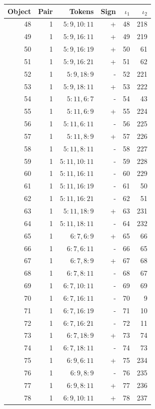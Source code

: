 \begin{center}\begin{tabular}{rrrrrr}\toprule Object & Pair & Tokens & Sign & $\iota_1$ & $\iota_2$\\\midrule
48 & 1 & $5:9,10:11$ & + & 48 & 218\\
49 & 1 & $5:9,16:11$ & + & 49 & 219\\
50 & 1 & $5:9,16:19$ & + & 50 & 61\\
51 & 1 & $5:9,16:21$ & + & 51 & 62\\
52 & 1 & $5:9,18:9$ & - & 52 & 221\\
53 & 1 & $5:9,18:11$ & + & 53 & 222\\
54 & 1 & $5:11,6:7$ & - & 54 & 43\\
55 & 1 & $5:11,6:9$ & + & 55 & 224\\
56 & 1 & $5:11,6:11$ & - & 56 & 225\\
57 & 1 & $5:11,8:9$ & + & 57 & 226\\
58 & 1 & $5:11,8:11$ & - & 58 & 227\\
59 & 1 & $5:11,10:11$ & - & 59 & 228\\
60 & 1 & $5:11,16:11$ & - & 60 & 229\\
61 & 1 & $5:11,16:19$ & - & 61 & 50\\
62 & 1 & $5:11,16:21$ & - & 62 & 51\\
63 & 1 & $5:11,18:9$ & + & 63 & 231\\
64 & 1 & $5:11,18:11$ & - & 64 & 232\\
65 & 1 & $6:7,6:9$ & + & 65 & 66\\
66 & 1 & $6:7,6:11$ & - & 66 & 65\\
67 & 1 & $6:7,8:9$ & + & 67 & 68\\
68 & 1 & $6:7,8:11$ & - & 68 & 67\\
69 & 1 & $6:7,10:11$ & - & 69 & 69\\
70 & 1 & $6:7,16:11$ & - & 70 & 9\\
71 & 1 & $6:7,16:19$ & - & 71 & 10\\
72 & 1 & $6:7,16:21$ & - & 72 & 11\\
73 & 1 & $6:7,18:9$ & + & 73 & 74\\
74 & 1 & $6:7,18:11$ & - & 74 & 73\\
75 & 1 & $6:9,6:11$ & + & 75 & 234\\
76 & 1 & $6:9,8:9$ & - & 76 & 235\\
77 & 1 & $6:9,8:11$ & + & 77 & 236\\
78 & 1 & $6:9,10:11$ & + & 78 & 237\\

\end{tabular}
\end{center}
